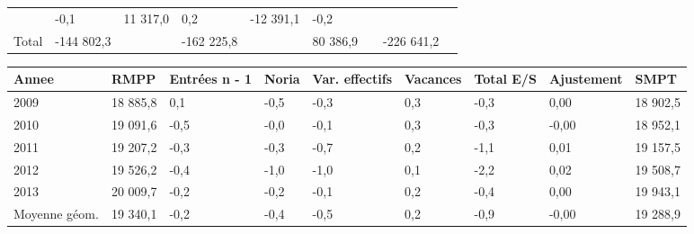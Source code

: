 \begin{longtable}[]{@{}lllllllll@{}}
\begin{minipage}[t]{0.16\columnwidth}
\end{minipage} & \begin{minipage}[t]{0.06\columnwidth}\raggedright
-0,1\strut
\end{minipage} & \begin{minipage}[t]{0.12\columnwidth}\raggedright
11 317,0\strut
\end{minipage} & \begin{minipage}[t]{0.06\columnwidth}\raggedright
0,2\strut
\end{minipage} & \begin{minipage}[t]{0.09\columnwidth}\raggedright
-12 391,1\strut
\end{minipage} & \begin{minipage}[t]{0.06\columnwidth}\raggedright
-0,2\strut
\end{minipage}\tabularnewline
\begin{minipage}[t]{0.05\columnwidth}\raggedright
Total\strut
\end{minipage} & \begin{minipage}[t]{0.10\columnwidth}\raggedright
-144 802,3\strut
\end{minipage} & \begin{minipage}[t]{0.06\columnwidth}\raggedright
\strut
\end{minipage} & \begin{minipage}[t]{0.16\columnwidth}\raggedright
-162 225,8\strut
\end{minipage} & \begin{minipage}[t]{0.06\columnwidth}\raggedright
\strut
\end{minipage} & \begin{minipage}[t]{0.12\columnwidth}\raggedright
80 386,9\strut
\end{minipage} & \begin{minipage}[t]{0.06\columnwidth}\raggedright
\strut
\end{minipage} & \begin{minipage}[t]{0.09\columnwidth}\raggedright
-226 641,2\strut
\end{minipage} & \begin{minipage}[t]{0.06\columnwidth}\raggedright
\strut
\end{minipage}\tabularnewline
\bottomrule
\end{longtable}

\begin{longtable}[]{@{}lllllllll@{}}
\toprule
Annee & RMPP & Entrées n - 1 & Noria & Var. effectifs & Vacances & Total
E/S & Ajustement & SMPT\tabularnewline
\midrule
\endhead
2009 & 18 885,8 & 0,1 & -0,5 & -0,3 & 0,3 & -0,3 & 0,00 & 18
902,5\tabularnewline
2010 & 19 091,6 & -0,5 & -0,0 & -0,1 & 0,3 & -0,3 & -0,00 & 18
952,1\tabularnewline
2011 & 19 207,2 & -0,3 & -0,3 & -0,7 & 0,2 & -1,1 & 0,01 & 19
157,5\tabularnewline
2012 & 19 526,2 & -0,4 & -1,0 & -1,0 & 0,1 & -2,2 & 0,02 & 19
508,7\tabularnewline
2013 & 20 009,7 & -0,2 & -0,2 & -0,1 & 0,2 & -0,4 & 0,00 & 19
943,1\tabularnewline
Moyenne géom. & 19 340,1 & -0,2 & -0,4 & -0,5 & 0,2 & -0,9 & -0,00 & 19
288,9\tabularnewline
\bottomrule
\end{longtable}


